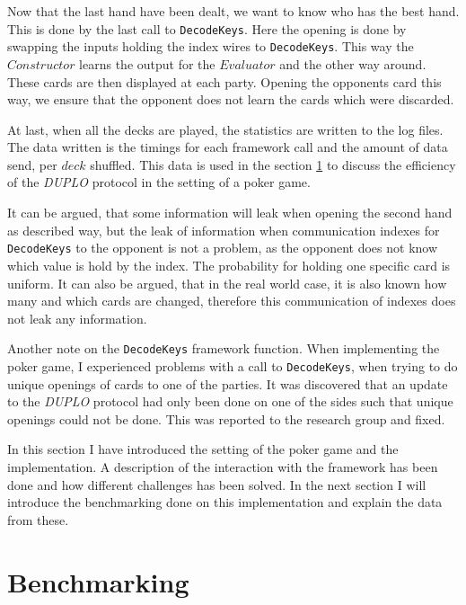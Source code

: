 \documentclass[twoside,11pt,openright]{report}
\newcommand{\DUPLO}{\textit{DUPLO} }
\begin{document}
Now that the last hand have been dealt, we want to know who has the best hand. This is done by the last call to \verb|DecodeKeys|. Here the opening is done by swapping the inputs holding the index wires to \verb|DecodeKeys|. This way the $Constructor$ learns the output for the $Evaluator$ and the other way around. These cards are then displayed at each party. Opening the opponents card this way, we ensure that the opponent does not learn the cards which were discarded.

At last, when all the decks are played, the statistics are written to the log files. The data written is the timings for each framework call and the amount of data send, per $deck$ shuffled. This data is used in the section \ref{sec:bechmarking} to discuss the efficiency of the \DUPLO protocol in the setting of a poker game.

\bigskip

It can be argued, that some information will leak when opening the second hand as described way, but the leak of information when communication indexes for \verb|DecodeKeys| to the opponent is not a problem, as the opponent does not know which value is hold by the index. The probability for holding one specific card is uniform. It can also be argued, that in the real world case, it is also known how many and which cards are changed, therefore this communication of indexes does not leak any information.

\bigskip

Another note on the \verb|DecodeKeys| framework function. When implementing the poker game, I experienced problems with a call to \verb|DecodeKeys|, when trying to do unique openings of cards to one of the parties. It was discovered that an update to the \DUPLO protocol had only been done on one of the sides such that unique openings could not be done. This was reported to the research group and fixed.

\bigskip

In this section I have introduced the setting of the poker game and the implementation. A description of the interaction with the framework has been done and how different challenges has been solved. In the next section I will introduce the benchmarking done on this implementation and explain the data from these.

\section{Benchmarking}
\label{sec:bechmarking}
\end{document}
